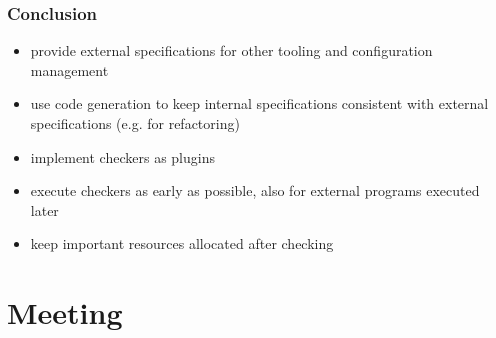 \begin{frame}
	\frametitle{Conclusion}

	\begin{itemize}[<+-| alert@+>]
	\item provide external specifications for other tooling and configuration management
	\item use code generation to keep internal specifications consistent with external specifications (e.g. for refactoring)
	\item implement checkers as plugins
	\item execute checkers as early as possible,
	also for external programs executed later
	\item keep important resources allocated after checking
	\end{itemize}
\end{frame}

\section{Meeting}

